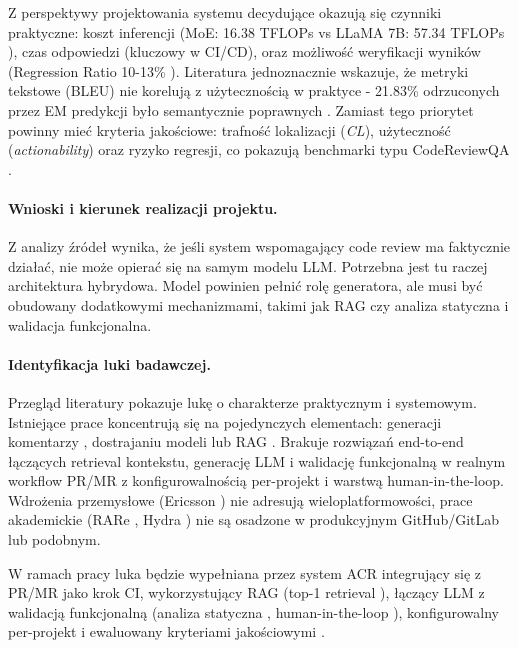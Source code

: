 Z perspektywy projektowania systemu decydujące okazują się czynniki praktyczne: koszt inferencji
(MoE: 16.38 TFLOPs vs LLaMA 7B: 57.34 TFLOPs \cite{Tang2025MoEReviewer}), czas odpowiedzi
(kluczowy w CI/CD), oraz możliwość weryfikacji wyników (Regression Ratio 10-13\%
\cite{Cihan2025EvaluatingLLMsForCodeReview}). Literatura jednoznacznie wskazuje, że metryki tekstowe
(BLEU) nie korelują z użytecznością w praktyce - 21.83\% odrzuconych przez EM predykcji było
semantycznie poprawnych \cite{Tufano2024CodeReviewAutomation}. Zamiast tego priorytet powinny mieć
kryteria jakościowe: trafność lokalizacji (\emph{CL}), użyteczność (\emph{actionability}) oraz
ryzyko regresji, co pokazują benchmarki typu CodeReviewQA \cite{Lin2025CodeReviewQA}.

\paragraph{Wnioski i kierunek realizacji projektu.}
Z analizy źródeł wynika, że jeśli system wspomagający code review ma faktycznie działać, nie 
może opierać się na samym modelu LLM. Potrzebna jest tu raczej architektura hybrydowa. Model 
powinien pełnić rolę generatora, ale musi być obudowany dodatkowymi mechanizmami, takimi jak RAG czy 
analiza statyczna i walidacja funkcjonalna.

\paragraph{Identyfikacja luki badawczej.}
Przegląd literatury pokazuje lukę o charakterze praktycznym i systemowym. Istniejące prace koncentrują się na 
pojedynczych elementach: generacji komentarzy \cite{Pornprasit2024FineTuningPromptingCR, Haider2024PromptingFineTuningRCG},
dostrajaniu modeli \cite{Lu2023LLaMAReviewer, Tang2025MoEReviewer} lub RAG \cite{Meng2025RARe}. Brakuje 
rozwiązań end-to-end łączących retrieval kontekstu, generację LLM i walidację funkcjonalną w realnym workflow PR/MR 
z konfigurowalnością per-projekt i warstwą human-in-the-loop. Wdrożenia przemysłowe (Ericsson \cite{Ramesh2025EricssonExperience}) nie adresują wieloplatformowości, prace 
akademickie (RARe \cite{Meng2025RARe}, Hydra \cite{Ren2025HydraReviewer}) nie są osadzone w produkcyjnym GitHub/GitLab lub podobnym.

W ramach pracy luka będzie wypełniana przez system ACR integrujący się z PR/MR jako 
krok CI, wykorzystujący RAG (top-1 retrieval \cite{Meng2025RARe}), łączący LLM z walidacją funkcjonalną (analiza statyczna 
\cite{Jaoua2025LLMStaticAnalyzersCR}, human-in-the-loop \cite{bacchelli2013}), konfigurowalny per-projekt i ewaluowany
kryteriami jakościowymi \cite{Lin2025CodeReviewQA, Ramesh2025EricssonExperience}.


